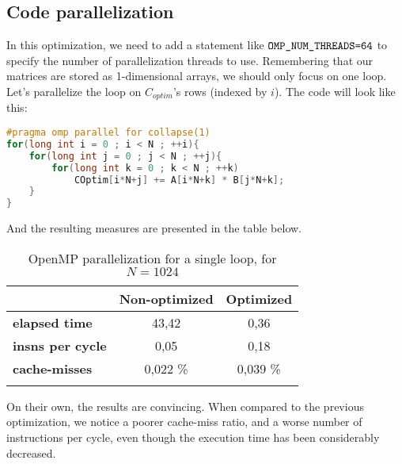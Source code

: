 \documentclass[a4paper, 10 pt, conference]{ieeeconf}
\newcommand{\tabhead}[1]{{\bfseries#1}}
\begin{document}
\subsection{Code parallelization}
In this optimization, we need to add a statement like $\verb|OMP_NUM_THREADS=64|$ to specify the number of parallelization threads to use. Remembering that our matrices are stored as 1-dimensional arrays, we should only focus on one loop. Let's parallelize the loop on $C_{optim}$'s rows (indexed by $i$). The code will look like this:
\begin{lstlisting}[language=C++, caption={OpenMP parallelization for a single loop}]
#pragma omp parallel for collapse(1)
for(long int i = 0 ; i < N ; ++i){
    for(long int j = 0 ; j < N ; ++j){
        for(long int k = 0 ; k < N ; ++k)
            COptim[i*N+j] += A[i*N+k] * B[j*N+k];
    }
}
\end{lstlisting}
And the resulting measures are presented in the table below.
\begin{table}[h!]
    \centering
    \begin{tabular}{l c c}
        \toprule
         & \tabhead{Non-optimized} & \tabhead{Optimized} \\
        \midrule
        \tabhead{elapsed time} & 43,42 & 0,36 \\
        \tabhead{insns per cycle} & 0,05 & 0,18 \\
        \tabhead{cache-misses} & 0,022  \% & 0,039 \%\\
        \bottomrule\\
    \end{tabular}
    \caption{OpenMP parallelization for a single loop, for $N=1024$}
\end{table}
On their own, the results are convincing. When compared to the previous optimization, we notice a poorer cache-miss ratio, and a worse number of instructions per cycle, even though the execution time has been considerably decreased.


\end{document}
